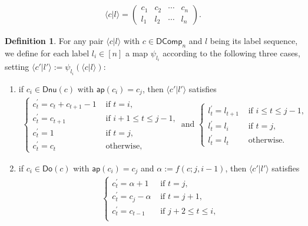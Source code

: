 \documentclass[reqno]{amsart}
\numberwithin{equation}{section}
\theoremstyle{definition}
\newtheorem{definition}{Definition}[section]
\theoremstyle{named}
\def\DComp{\mathsf{DComp}}
\def\Dnu{\mathsf{Dnu}}
\def\Do{\mathsf{Do}}
\def\ap{\mathsf{ap}}
\begin{document}
\begin{align*}
\langle c|l \rangle=
\begin{pmatrix}
c_1 & c_2 & \cdots & c_n \\
l_1 & l_2 & \cdots & l_n
\end{pmatrix}.
\end{align*}


\begin{definition}\label{def-psi}
For any pair $\langle c|l\rangle$ with $c\in\DComp_n$ and $l$ being its label sequence, we define for each label $l_i\in[n]$ a map $\psi_{l_i}$ according to the following three cases, setting $\langle c'|l'\rangle:=\psi_{l_i}(\langle c|l\rangle)$:
\begin{enumerate}
	\item if $c_i\in \Dnu(c)$ with $\ap(c_i)=c_j$, then $\langle c'|l'\rangle$ satisfies 
	\begin{align*}
		\begin{cases}
			c_t^{\prime}=c_t+c_{t+1}-1  &  \text{ if  $t=i$,} \\
			c_t^{\prime}=c_{t+1}& \text{ if $i+1\le t\le j-1$,}  \\
			c_t^{\prime}=1& \text{ if $t=j$, } \\
			c_t^{\prime}=c_t& \text{ otherwise,} 
		\end{cases}
		\text{ and } 
	\begin{cases}
		l_t^{\prime}=l_{t+1}  &  \text{ if $i\le t\le j-1$,}  \\
		l_t^{\prime}=l_{i}& \text{ if $t=j$,}  \\
		l_t^{\prime}=l_t& \text{ otherwise.} 
	\end{cases}
	\end{align*}
	\item if $c_i\in \Do(c)$ with $\ap(c_i)=c_j$ and $\alpha:=f(c;j,i-1)$, then $\langle c'|l'\rangle$ satisfies
	\begin{align*}
		\begin{cases}
			c_t^{\prime}=\alpha+1  &  \text{ if  $t=j$, }\\
			c_t^{\prime}=c_j-\alpha& \text{ if $t=j+1$,}  \\
			c_t^{\prime}=c_{t-1}& \text{ if $j+2\le t\le i$,}  \\

\end{cases}
\end{align*}
\end{enumerate}
\end{definition}
\end{document}
